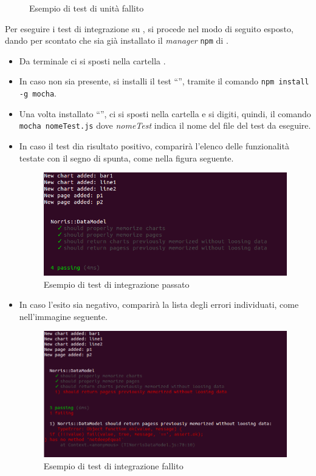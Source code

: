 \begin{itemize}
\begin{figure}[H]
							\caption{Esempio di test di unità fallito}
						\end{figure}
					\end{itemize}
					
					Per eseguire i test di integrazione su , si procede nel modo di seguito esposto, dando per scontato che sia già installato il \textit{ manager} \texttt{npm} di .
					\begin{itemize}
						\item Da terminale ci si sposti nella cartella .
						\item In caso non sia presente, si installi il test  “”, tramite il comando \texttt{npm install -g mocha}. 
						\item Una volta installato “”, ci si sposti nella cartella  e si digiti, quindi, il comando \texttt{mocha nomeTest.js} dove \textit{nomeTest} indica il nome del file del test da eseguire.
						\item In caso il test dia risultato positivo, comparirà l'elenco delle funzionalità testate con il segno di spunta, come nella figura seguente.
						\begin{figure}[H]
							\centering
							\includegraphics[scale=0.5]{Pics/TIPassing.png}
							\caption{Esempio di test di integrazione passato}
						\end{figure}
						\item In caso l'esito sia negativo, comparirà la lista degli errori individuati, come nell'immagine seguente.
						\begin{figure}[H]
							\centering
							\includegraphics[scale=0.5]{Pics/TINotPassing.png}
							\caption{Esempio di test di integrazione fallito}
						\end{figure}
					\end{itemize}
					
